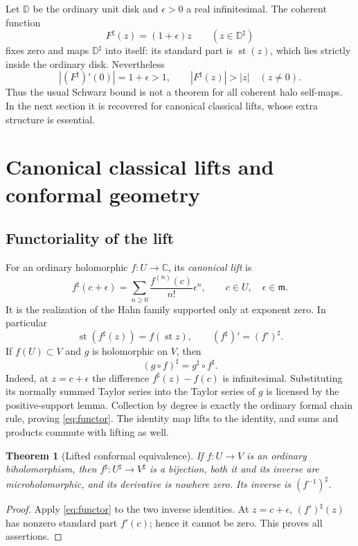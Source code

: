 \documentclass[11pt,letterpaper]{article}
\numberwithin{equation}{section}
\newtheorem{theorem}{Theorem}[section]
\theoremstyle{definition}
\theoremstyle{remark}
\newcommand{\C}{\mathbb C}
\newcommand{\mm}{\mathfrak m}
\DeclareMathOperator{\st}{st}
\begin{document}
Let $\mathbb D$ be the ordinary unit disk and $\epsilon>0$ a real
infinitesimal. The coherent function
\[
 F^\sharp(z)=(1+\epsilon)z\qquad(z\in\mathbb D^\sharp)
\]
fixes zero and maps $\mathbb D^\sharp$ into itself: its standard part
is $\st(z)$, which lies strictly inside the ordinary disk. Nevertheless
\[
 |(F^\sharp)'(0)|=1+\epsilon>1,
 \qquad |F^\sharp(z)|>|z|\quad(z\ne0).
\]
Thus the usual Schwarz bound is not a theorem for all coherent halo
self-maps. In the next section it is recovered for canonical classical
lifts, whose extra structure is essential.

\section{Canonical classical lifts and conformal geometry}
\label{sec:lifts}

\subsection{Functoriality of the lift}

For an ordinary holomorphic $f:U\to\C$, its \emph{canonical lift} is
\begin{equation}\label{eq:classicallift}
 f^\sharp(c+\epsilon)
 =\sum_{n\ge0}\frac{f^{(n)}(c)}{n!}\epsilon^n,
 \qquad c\in U,\quad\epsilon\in\mm.
\end{equation}
It is the realization of the Hahn family supported only at exponent
zero. In particular
\[
 \st(f^\sharp(z))=f(\st z),\qquad
 (f^\sharp)'=(f')^\sharp.
\]
If $f(U)\subset V$ and $g$ is holomorphic on $V$, then
\begin{equation}\label{eq:functor}
 (g\circ f)^\sharp=g^\sharp\circ f^\sharp.
\end{equation}
Indeed, at $z=c+\epsilon$ the difference
$f^\sharp(z)-f(c)$ is infinitesimal. Substituting its normally summed
Taylor series into the Taylor series of $g$ is licensed by the
positive-support lemma. Collection by degree is exactly the ordinary
formal chain rule, proving \eqref{eq:functor}. The identity map lifts
to the identity, and sums and products commute with lifting as well.

\begin{theorem}[Lifted conformal equivalence]
If $f:U\to V$ is an ordinary biholomorphism, then
$f^\sharp:U^\sharp\to V^\sharp$ is a bijection, both it and its
inverse are microholomorphic, and its derivative is nowhere zero.
Its inverse is $(f^{-1})^\sharp$.
\end{theorem}
\begin{proof}
Apply \eqref{eq:functor} to the two inverse identities. At $z=c+\epsilon$,
$(f')^\sharp(z)$ has nonzero standard part $f'(c)$; hence it cannot be
zero. This proves all assertions.
\end{proof}
\end{document}
